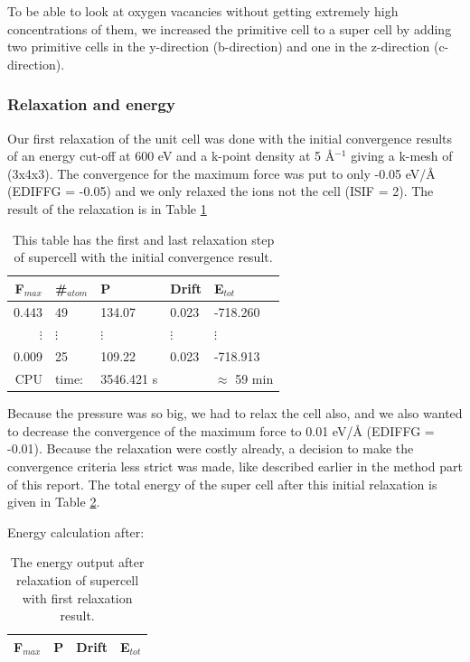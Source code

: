 To be able to look at oxygen vacancies without getting extremely high concentrations of them, we increased the primitive cell to a super cell by adding two primitive cells in the y-direction (b-direction) and one in the z-direction (c-direction). 

\subsubsection{Relaxation and energy}

Our first relaxation of the unit cell was done with the initial convergence results of an energy cut-off at 600 eV and a k-point density at 5 Å$^{-1}$ giving a k-mesh of (3x4x3). The convergence for the maximum force was put to only -0.05 eV/Å (EDIFFG = -0.05) and we only relaxed the ions not the cell (ISIF = 2). The result of the relaxation is in Table \ref{tab:ionstep_convergence}

\begin{table}[H]\caption{This table has the first and last relaxation step of supercell with the initial convergence result.}\label{tab:ionstep_convergence}
\begin{tabular}{rllll}
F$_{max}$ &\#$_{atom}$&	P&	Drift&	E$_{tot}$\\ \hline
0.443&	49&	134.07&	0.023&	-718.260\\
$\vdots$&$\vdots$&$\vdots$&$\vdots$&$\vdots$\\
0.009&	25&	109.22&	0.023&	-718.913\\
CPU &time: & 3546.421 s & & $\approx$ 59 min  \\
\end{tabular}
\end{table}

Because the pressure was so big, we had to relax the cell also, and we also wanted to decrease the convergence of the maximum force to 0.01 eV/Å (EDIFFG = -0.01). Because the relaxation were costly already, a decision to make the convergence criteria less strict was made, like described earlier in the method part of this report. The total energy of the super cell after this initial relaxation is given in Table \ref{tab:energy_supercell_after_relax}.

Energy calculation after:
\begin{table}[H]\caption{The energy output after relaxation of supercell with first relaxation result.}\label{tab:energy_supercell_after_relax}
\begin{tabular}{llll}
F$_{max}$ & P&	Drift&	E$_{tot}$\\ \hline
\end{tabular}
\end{table}

